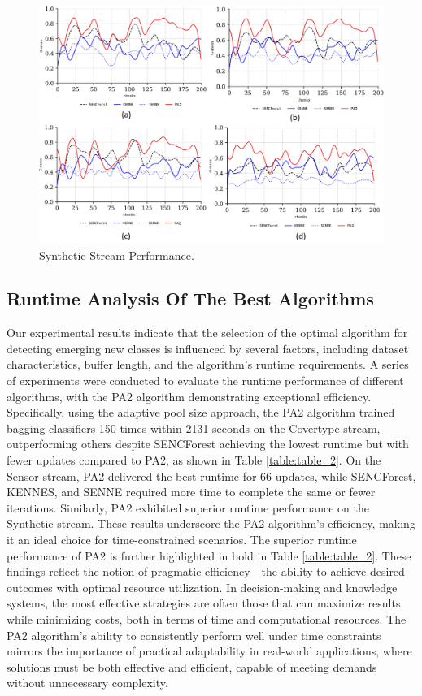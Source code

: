 \begin{figure}[!ht]
	\centering
	\includegraphics[width=1\linewidth]{5_Emerging/images/res3.png}
	\caption{Synthetic Stream Performance.}

	\label{fig:res3}
\end{figure}				

\subsection{Runtime Analysis Of The Best Algorithms}
\label{sec:running}
Our experimental results indicate that the selection of the optimal algorithm for detecting emerging new classes is influenced by several factors, including dataset characteristics, buffer length, and the algorithm's runtime requirements. A series of experiments were conducted to evaluate the runtime performance of different algorithms, with the PA2 algorithm demonstrating exceptional efficiency. Specifically, using the adaptive pool size approach, the PA2 algorithm trained bagging classifiers 150 times within 2131 seconds on the Covertype stream, outperforming others despite SENCForest achieving the lowest runtime but with fewer updates compared to PA2, as shown in Table \ref{table:table_2}. On the Sensor stream, PA2 delivered the best runtime for 66 updates, while SENCForest, KENNES, and SENNE required more time to complete the same or fewer iterations. Similarly, PA2 exhibited superior runtime performance on the Synthetic stream. These results underscore the PA2 algorithm’s efficiency, making it an ideal choice for time-constrained scenarios. The superior runtime performance of PA2 is further highlighted in bold in Table \ref{table:table_2}. These findings reflect the notion of pragmatic efficiency—the ability to achieve desired outcomes with optimal resource utilization. In decision-making and knowledge systems, the most effective strategies are often those that can maximize results while minimizing costs, both in terms of time and computational resources. The PA2 algorithm’s ability to consistently perform well under time constraints mirrors the importance of practical adaptability in real-world applications, where solutions must be both effective and efficient, capable of meeting demands without unnecessary complexity.
	
